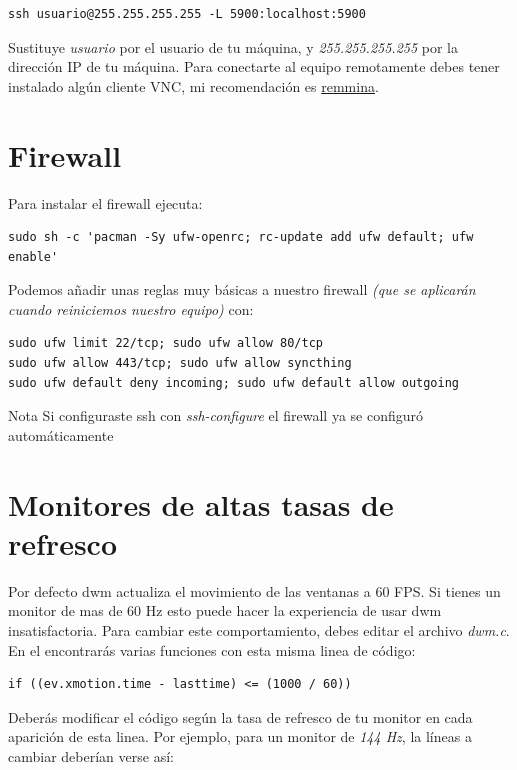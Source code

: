 \documentclass[11pt]{article}
\begin{document}
\begin{verbatim}
ssh usuario@255.255.255.255 -L 5900:localhost:5900
\end{verbatim}

Sustituye \emph{usuario} por el usuario de tu máquina, y \emph{255.255.255.255} por la dirección IP de tu máquina. Para conectarte al equipo remotamente debes tener instalado algún cliente VNC, mi recomendación es \href{https://github.com/FreeRDP/Remmina}{remmina}.

\section{Firewall}

Para instalar el firewall ejecuta:

\begin{verbatim}
sudo sh -c 'pacman -Sy ufw-openrc; rc-update add ufw default; ufw enable'
\end{verbatim}

Podemos añadir unas reglas muy básicas a nuestro firewall \emph{(que se aplicarán cuando reiniciemos nuestro equipo)} con:

\begin{verbatim}
sudo ufw limit 22/tcp; sudo ufw allow 80/tcp
sudo ufw allow 443/tcp; sudo ufw allow syncthing
sudo ufw default deny incoming; sudo ufw default allow outgoing
\end{verbatim}

\begin{mybox}{Nota}
	Si configuraste ssh con \emph{ssh-configure} el firewall ya se configuró automáticamente
\end{mybox}

\section{Monitores de altas tasas de refresco}

Por defecto dwm actualiza el movimiento de las ventanas a 60 FPS. Si tienes un monitor de mas de 60 Hz esto puede hacer la experiencia de usar dwm insatisfactoria. Para cambiar este comportamiento, debes editar el archivo \emph{dwm.c}. En el encontrarás varias funciones con esta misma linea de código:

\begin{verbatim}
if ((ev.xmotion.time - lasttime) <= (1000 / 60))
\end{verbatim}

Deberás modificar el código según la tasa de refresco de tu monitor en cada aparición de esta linea. Por ejemplo, para un monitor de \emph{144 Hz}, la líneas a cambiar deberían verse así:
\end{document}
